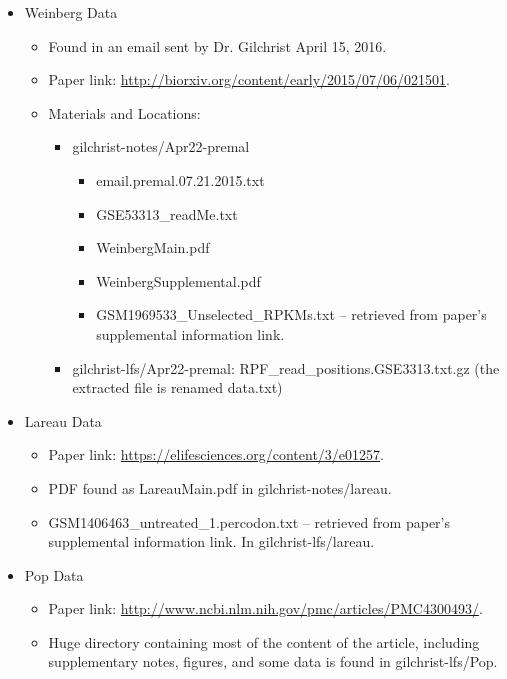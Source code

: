 \documentclass[12pt,hyperref]{labbook}
\begin{document}
\begin{itemize}
    \item Weinberg Data
    \begin{itemize}
        \item Found in an email sent by Dr. Gilchrist April 15, 2016.
        \item Paper link: \url{http://biorxiv.org/content/early/2015/07/06/021501}.
        \item Materials and Locations:
        \begin{itemize}
            \item gilchrist-notes/Apr22-premal
            \begin{itemize}
                \item email.premal.07.21.2015.txt
                \item GSE53313\_readMe.txt
                \item WeinbergMain.pdf
                \item WeinbergSupplemental.pdf
                \item GSM1969533\_Unselected\_RPKMs.txt -- 
                retrieved from paper's supplemental information link.
            \end{itemize}
            \item gilchrist-lfs/Apr22-premal: RPF\_read\_positions.GSE3313.txt.gz
            (the extracted file is renamed data.txt)
        \end{itemize}
    \end{itemize}
    \item Lareau Data
    \begin{itemize}
        \item Paper link: \url{https://elifesciences.org/content/3/e01257}.
        \item PDF found as LareauMain.pdf in gilchrist-notes/lareau.
        \item GSM1406463\_untreated\_1.percodon.txt --
        retrieved from paper's supplemental information link. In gilchrist-lfs/lareau.
    \end{itemize}
    \item Pop Data
    \begin{itemize}
        \item Paper link: \url{http://www.ncbi.nlm.nih.gov/pmc/articles/PMC4300493/}.
        \item Huge directory containing most of the content of the article, including supplementary notes, figures, and some data is found in gilchrist-lfs/Pop.

\end{itemize}
\end{itemize}
\end{document}
